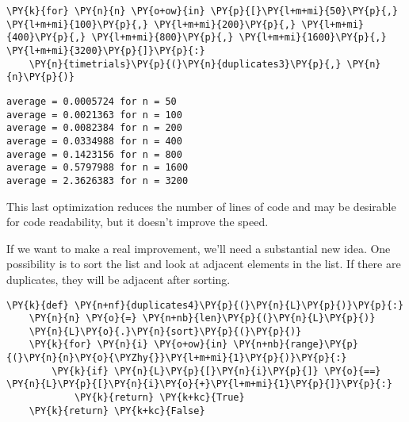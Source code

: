 \begin{Verbatim}[commandchars=\\\{\}]
\PY{k}{for} \PY{n}{n} \PY{o+ow}{in} \PY{p}{[}\PY{l+m+mi}{50}\PY{p}{,} \PY{l+m+mi}{100}\PY{p}{,} \PY{l+m+mi}{200}\PY{p}{,} \PY{l+m+mi}{400}\PY{p}{,} \PY{l+m+mi}{800}\PY{p}{,} \PY{l+m+mi}{1600}\PY{p}{,} \PY{l+m+mi}{3200}\PY{p}{]}\PY{p}{:}
    \PY{n}{timetrials}\PY{p}{(}\PY{n}{duplicates3}\PY{p}{,} \PY{n}{n}\PY{p}{)}
\end{Verbatim}

\begin{Verbatim}
average = 0.0005724 for n = 50
average = 0.0021363 for n = 100
average = 0.0082384 for n = 200
average = 0.0334988 for n = 400
average = 0.1423156 for n = 800
average = 0.5797988 for n = 1600
average = 2.3626383 for n = 3200

\end{Verbatim}


This last optimization reduces the number of lines of code and may be desirable for code readability, but it doesn't improve the speed.


If we want to make a real improvement, we'll need a substantial new idea.
One possibility is to sort the list and look at adjacent elements in the list.
If there are duplicates, they will be adjacent after sorting.

\begin{Verbatim}[commandchars=\\\{\}]
\PY{k}{def} \PY{n+nf}{duplicates4}\PY{p}{(}\PY{n}{L}\PY{p}{)}\PY{p}{:}
    \PY{n}{n} \PY{o}{=} \PY{n+nb}{len}\PY{p}{(}\PY{n}{L}\PY{p}{)}
    \PY{n}{L}\PY{o}{.}\PY{n}{sort}\PY{p}{(}\PY{p}{)}
    \PY{k}{for} \PY{n}{i} \PY{o+ow}{in} \PY{n+nb}{range}\PY{p}{(}\PY{n}{n}\PY{o}{\PYZhy{}}\PY{l+m+mi}{1}\PY{p}{)}\PY{p}{:}
        \PY{k}{if} \PY{n}{L}\PY{p}{[}\PY{n}{i}\PY{p}{]} \PY{o}{==} \PY{n}{L}\PY{p}{[}\PY{n}{i}\PY{o}{+}\PY{l+m+mi}{1}\PY{p}{]}\PY{p}{:}
            \PY{k}{return} \PY{k+kc}{True}
    \PY{k}{return} \PY{k+kc}{False}
\end{Verbatim}


